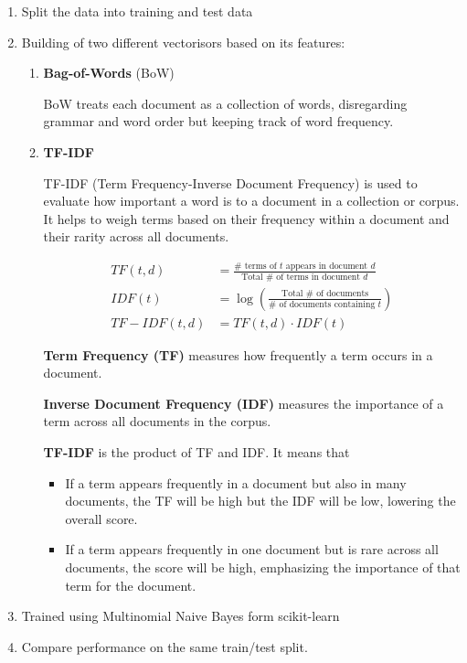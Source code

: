 \begin{enumerate}
    \item Split the data into training and test data
    \item Building of two different vectorisors based on its features:
    \begin{enumerate}
        \item \textbf{Bag-of-Words} (BoW)
        
        BoW treats each document as a collection of words, disregarding grammar and word order but keeping track of word frequency.
        
        \item \textbf{TF-IDF}
        
        TF-IDF (Term Frequency-Inverse Document Frequency)  is used to evaluate how important a word is to a document in a collection or corpus.
        It helps to weigh terms based on their frequency within a document and their rarity across all documents.

        \begin{align}
            TF(t,d) &= \frac{\# \text{ terms of } t \text{ appears in document } d}{\text{Total } \# \text{ of terms in document }d}\\
            IDF(t) &= \log \left( \frac{\text{Total } \# \text{ of documents}}{\# \text{ of documents containing } t} \right)\\
            TF-IDF(t, d) &= TF(t,d) \cdot IDF(t)
        \end{align}

        \textbf{Term Frequency (TF)} measures how frequently a term occurs in a document.

        \textbf{Inverse Document Frequency (IDF)} measures the importance of a term across all documents in the corpus.

        \textbf{TF-IDF} is the product of TF and IDF. It means that 
        \begin{itemize}
            \item If a term appears frequently in a document but also in many documents, the TF will be high but the IDF will be low, lowering the overall score.
            \item If a term appears frequently in one document but is rare across all documents, the score will be high, emphasizing the importance of that term for the document.
        \end{itemize}

    \end{enumerate}
    \item Trained using Multinomial Naive Bayes form scikit-learn
    \item Compare performance on the same train/test split. 
\end{enumerate}


